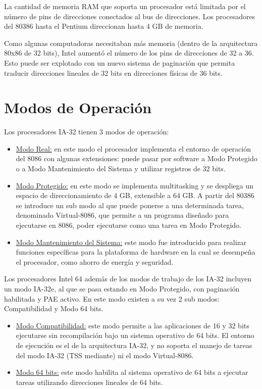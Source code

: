 La cantidad de memoria RAM que soporta un procesador est\'a limitada por el n\'umero de pins de direcciones conectados al bus de direcciones. Los
procesadores del 80386 hasta el Pentium direccionan hasta 4 GB de memoria.

Como algunas computadoras necesitaban m\'as memoria (dentro de la arquitectura 80x86 de 32 bits), Intel aument\'o el n\'umero de los pins de direcciones
de 32 a 36. Esto puede ser explotado con un nuevo sistema de paginaci\'on que permita traducir direcciones lineales de 32 bits en direcciones f\'isicas de 36 bits.


\newpage

\section{Modos de Operaci\'on}

Los procesadores IA-32 tienen 3 modos de operaci\'on:


\begin{itemize}
 \item \underline{Modo Real:} en este modo el procesador implementa el entorno de operaci\'on del 8086 con algunas extensiones: puede pasar por
 software a Modo Protegido o a Modo Mantenimiento del Sistema y utilizar registros de 32 bits.
 \item \underline{Modo Protegido:} en este modo se implementa multitasking y se despliega un espacio de direccionamiento de 4 GB, extensible a
 64 GB. A partir del 80386 se introduce un sub modo al que puede ponerse a una determinada tarea, denominado Virtual-8086, que permite a un programa
 dise\~nado para ejecutarse en 8086, poder ejecutarse como una tarea en Modo Protegido.
 \item \underline{Modo Mantenimiento del Sistema:} este modo fue introducido para realizar funciones espec\'ificas para la plataforma de hardware en la
 cual se desempe\~na el procesador, como ahorro de energ\'ia y seguridad.
\end{itemize}

Los procesadores Intel 64 adem\'as de los modos de trabajo de los IA-32 incluyen un modo IA-32e, al que se pasa estando en Modo Protegido, con paginaci\'on
habilitada y PAE activo. En este modo existen a su vez 2 sub modos: Compatibilidad y Modo 64 bits.

\begin{itemize}
 \item \underline{Modo Compatibilidad:} este modo permite a las aplicaciones de 16 y 32 bits ejecutarse sin recompilaci\'on bajo un sistema operativo
 de 64 bits. El entorno de ejecuci\'on es el de la arquitectura IA-32, y no soporta el manejo de tareas del modo IA-32 (TSS mediante) ni el modo Virtual-8086.
 \item \underline{Modo 64 bits:} este modo habilita al sistema operativo de 64 bits a ejecutar tareas utilizando direcciones lineales de 64 bits.
\end{itemize}

